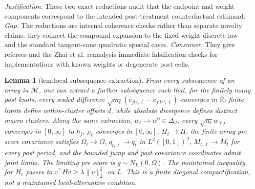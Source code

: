 \documentclass{article}
\newtheorem{lemma}{Lemma}
\begin{document}
\par\smallskip\noindent \textit{Justification.} These two exact reductions audit that the endpoint and weight components correspond to the intended post-treatment counterfactual estimand. \textit{Gap.} The reductions are internal coherence checks rather than separate novelty claims; they connect the compound expansion to the fixed-weight discrete law and the standard tangent-cone quadratic special cases. \textit{Consumer.} They give referees and the Zhai et al. reanalysis immediate falsification checks for implementations with known weights or degenerate post cells.

\begin{lemma}[lem:local-subsequence-extraction]\label{lem:local-subsequence-extraction}
From every subsequence of an array in \(\mathcal M\), one can extract a further subsequence such that, for the finitely many post knots, every scaled difference \(\sqrt{m_\ell}(c_{jtr,\ell}-c_{j'tr',\ell})\) converges in \(\overline{\mathbb R}\); finite limits define within-cluster offsets \(d\), while absolute divergence defines distinct macro clusters.  Along the same extraction, \(w_\ell\to w^0\in\Delta_J\), every \(\sqrt{n_\ell}w_{\ell j}\) converges in \([0,\infty]\) to \(h_j\), \(\rho_\ell\) converges in \([0,\infty]\), \(H_\ell\to H\), the finite-array pre-score covariance satisfies \(\Omega_\ell\to\Omega\), \(q_{t,\ell}\to q_t\) in \(L^2([0,1])^J\), \(M_{t,\ell}\to M_t\) for every post period, and the bounded jump and post covariance coordinates admit joint limits.  The limiting pre score is \(g\sim N_L(0,\Omega)\).  The maintained inequality for \(H_\ell\) passes to \(v^\top Hv\geq\lambda\|v\|_2^2\) on \(L\).  This is a finite diagonal compactification, not a maintained local-alternative condition.
\end{lemma}
\end{document}
